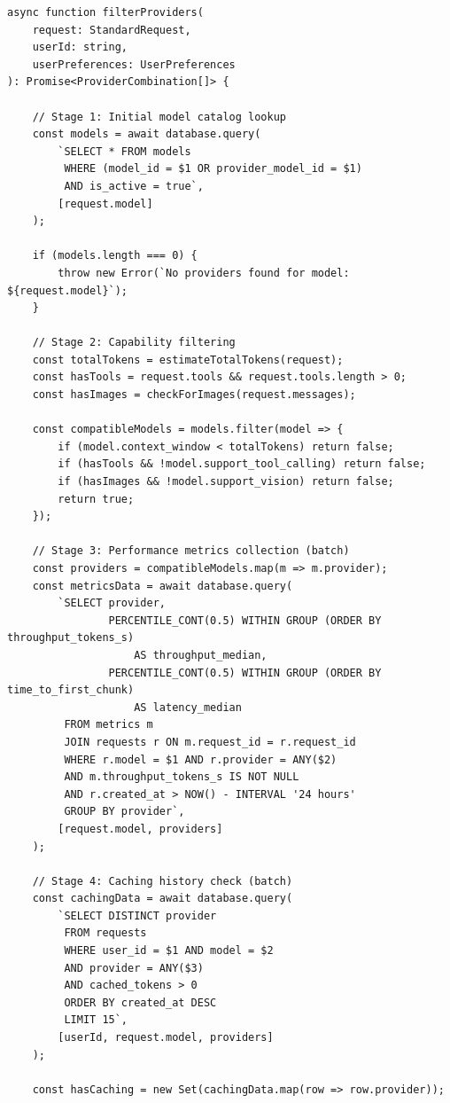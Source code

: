 \documentclass[english]{article}
\begin{document}
\begin{listing}[H]
\begin{verbatim}
async function filterProviders(
    request: StandardRequest,
    userId: string,
    userPreferences: UserPreferences
): Promise<ProviderCombination[]> {

    // Stage 1: Initial model catalog lookup
    const models = await database.query(
        `SELECT * FROM models
         WHERE (model_id = $1 OR provider_model_id = $1)
         AND is_active = true`,
        [request.model]
    );

    if (models.length === 0) {
        throw new Error(`No providers found for model: ${request.model}`);
    }

    // Stage 2: Capability filtering
    const totalTokens = estimateTotalTokens(request);
    const hasTools = request.tools && request.tools.length > 0;
    const hasImages = checkForImages(request.messages);

    const compatibleModels = models.filter(model => {
        if (model.context_window < totalTokens) return false;
        if (hasTools && !model.support_tool_calling) return false;
        if (hasImages && !model.support_vision) return false;
        return true;
    });

    // Stage 3: Performance metrics collection (batch)
    const providers = compatibleModels.map(m => m.provider);
    const metricsData = await database.query(
        `SELECT provider,
                PERCENTILE_CONT(0.5) WITHIN GROUP (ORDER BY throughput_tokens_s)
                    AS throughput_median,
                PERCENTILE_CONT(0.5) WITHIN GROUP (ORDER BY time_to_first_chunk)
                    AS latency_median
         FROM metrics m
         JOIN requests r ON m.request_id = r.request_id
         WHERE r.model = $1 AND r.provider = ANY($2)
         AND m.throughput_tokens_s IS NOT NULL
         AND r.created_at > NOW() - INTERVAL '24 hours'
         GROUP BY provider`,
        [request.model, providers]
    );

    // Stage 4: Caching history check (batch)
    const cachingData = await database.query(
        `SELECT DISTINCT provider
         FROM requests
         WHERE user_id = $1 AND model = $2
         AND provider = ANY($3)
         AND cached_tokens > 0
         ORDER BY created_at DESC
         LIMIT 15`,
        [userId, request.model, providers]
    );

    const hasCaching = new Set(cachingData.map(row => row.provider));


\end{verbatim}
\end{listing}
\end{document}

